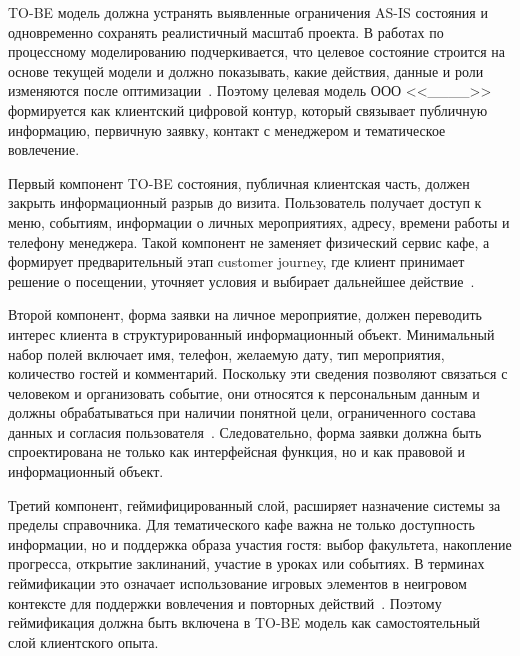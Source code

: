 TO-BE модель должна устранять выявленные ограничения AS-IS состояния и одновременно сохранять реалистичный масштаб проекта. В работах по процессному моделированию подчеркивается, что целевое состояние строится на основе текущей модели и должно показывать, какие действия, данные и роли изменяются после оптимизации~\cite{ermilina2025,alieva2023}. Поэтому целевая модель ООО <<\_\_\_\_>> формируется как клиентский цифровой контур, который связывает публичную информацию, первичную заявку, контакт с менеджером и тематическое вовлечение.

Первый компонент TO-BE состояния, публичная клиентская часть, должен закрыть информационный разрыв до визита. Пользователь получает доступ к меню, событиям, информации о личных мероприятиях, адресу, времени работы и телефону менеджера. Такой компонент не заменяет физический сервис кафе, а формирует предварительный этап customer journey, где клиент принимает решение о посещении, уточняет условия и выбирает дальнейшее действие~\cite{pantouvakis2022,rita2022}.

Второй компонент, форма заявки на личное мероприятие, должен переводить интерес клиента в структурированный информационный объект. Минимальный набор полей включает имя, телефон, желаемую дату, тип мероприятия, количество гостей и комментарий. Поскольку эти сведения позволяют связаться с человеком и организовать событие, они относятся к персональным данным и должны обрабатываться при наличии понятной цели, ограниченного состава данных и согласия пользователя~\cite{fz152,moric2024}. Следовательно, форма заявки должна быть спроектирована не только как интерфейсная функция, но и как правовой и информационный объект.

Третий компонент, геймифицированный слой, расширяет назначение системы за пределы справочника. Для тематического кафе важна не только доступность информации, но и поддержка образа участия гостя: выбор факультета, накопление прогресса, открытие заклинаний, участие в уроках или событиях. В терминах геймификации это означает использование игровых элементов в неигровом контексте для поддержки вовлечения и повторных действий~\cite{deterding2011,sutrisno2026,xu2017}. Поэтому геймификация должна быть включена в TO-BE модель как самостоятельный слой клиентского опыта.

